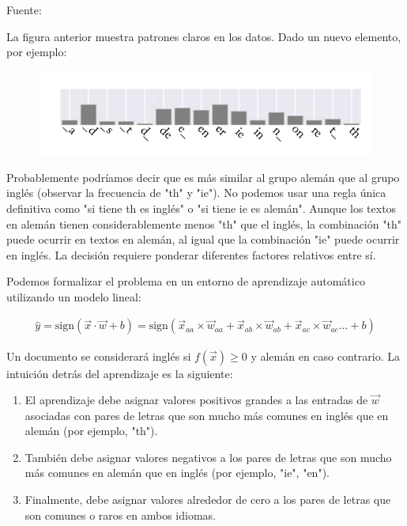 Fuente: \cite{goldberg2017neural}

La figura anterior muestra patrones claros en los datos. Dado un nuevo elemento, por ejemplo:

\begin{figure}[htb]
	\centering
	 \includegraphics[scale=0.4]{pics/langbigramstest.png}
\end{figure}

Probablemente podríamos decir que es más similar al grupo alemán que al grupo inglés (observar la frecuencia de "th" y "ie"). No podemos usar una regla única definitiva como "si tiene th es inglés" o "si tiene ie es alemán". Aunque los textos en alemán tienen considerablemente menos "th" que el inglés, la combinación "th" puede ocurrir en textos en alemán, al igual que la combinación "ie" puede ocurrir en inglés. La decisión requiere ponderar diferentes factores relativos entre sí.

Podemos formalizar el problema en un entorno de aprendizaje automático utilizando un modelo lineal:

\begin{equation}
\begin{split}
\hat{y} = \text{sign}(\vec{x}\cdot \vec{w} + b) = \text{sign}(\vec{x}_{aa}\times \vec{w}_{aa}+ \vec{x}_{ab}\times \vec{w}_{ab}+ \vec{x}_{ac}\times \vec{w}_{ac} \dots +b)
\end{split}
\end{equation}

Un documento se considerará inglés si $f(\vec{x}) \geq 0$ y alemán en caso contrario. La intuición detrás del aprendizaje es la siguiente:

\begin{enumerate}
\item El aprendizaje debe asignar valores positivos grandes a las entradas de $\vec{w}$ asociadas con pares de letras que son mucho más comunes en inglés que en alemán (por ejemplo, "th").
\item También debe asignar valores negativos a los pares de letras que son mucho más comunes en alemán que en inglés (por ejemplo, "ie", "en").
\item Finalmente, debe asignar valores alrededor de cero a los pares de letras que son comunes o raros en ambos idiomas.
\end{enumerate}


